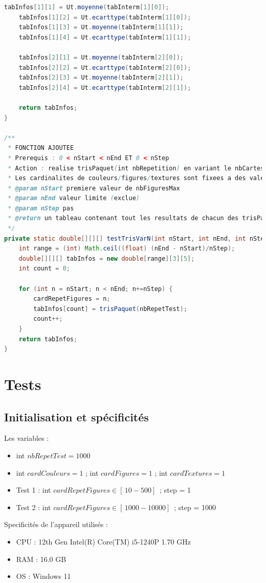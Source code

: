 \documentclass{report}
\begin{document}
\begin{lstlisting}[language=java, caption={\it Fonctions de calculs de données expérimentales}, label=codeTRI]
    tabInfos[1][1] = Ut.moyenne(tabInterm[1][0]);
    tabInfos[1][2] = Ut.ecarttype(tabInterm[1][0]);
    tabInfos[1][3] = Ut.moyenne(tabInterm[1][1]); 
    tabInfos[1][4] = Ut.ecarttype(tabInterm[1][1]);

    tabInfos[2][1] = Ut.moyenne(tabInterm[2][0]);
    tabInfos[2][2] = Ut.ecarttype(tabInterm[2][0]);
    tabInfos[2][3] = Ut.moyenne(tabInterm[2][1]); 
    tabInfos[2][4] = Ut.ecarttype(tabInterm[2][1]);

    return tabInfos;
}

/**
 * FONCTION AJOUTEE
 * Prerequis : 0 < nStart < nEnd ET 0 < nStep 
 * Action : realise trisPaquet(int nbRepetition) en variant le nbCartes en modifiant la cardinalite de nbFigures, entre en parametres, de nStart a nEnd(exclu) en faisant des pas de nStep.
 * Les cardinalites de couleurs/figures/textures sont fixees a des valeurs constantes par les variables de class.
 * @param nStart premiere valeur de nbFiguresMax
 * @param nEnd valeur limite (exclue)
 * @param nStep pas
 * @return un tableau contenant tout les resultats de chacun des trisPaquet().
 */
private static double[][][] testTrisVarN(int nStart, int nEnd, int nStep) {
    int range = (int) Math.ceil((float) (nEnd - nStart)/nStep);
    double[][][] tabInfos = new double[range][3][5];
    int count = 0;
    
    for (int n = nStart; n < nEnd; n+=nStep) {
        cardRepetFigures = n;
        tabInfos[count] = trisPaquet(nbRepetTest);
        count++;
    }
    return tabInfos;
}
\end{lstlisting}



\newpage
\section{Tests}
\subsection{Initialisation et spécificités}
Les variables :
\begin{itemize}
	\item int $nbRepetTest = 1000$
	\item int $cardCouleurs = 1$ ; int $cardFigures = 1$ ; int $cardTextures = 1$
	\item Test 1 : int $cardRepetFigures \in [\, 10-500 ]\, $ ; step = 1
	\item Test 2 : int $cardRepetFigures \in [\, 1000-10 000 ]\, $ ; step = 1000
	
\end{itemize}
Specificités de l'appareil utilisés :
\begin{itemize}
	\item[\ding{228}] CPU : 12th Gen Intel(R) Core(TM) i5-1240P   1.70 GHz
	\item[\ding{228}] RAM : 16.0 GB
	\item[\ding{228}] OS  : Windows 11
\end{itemize}
\end{document}
